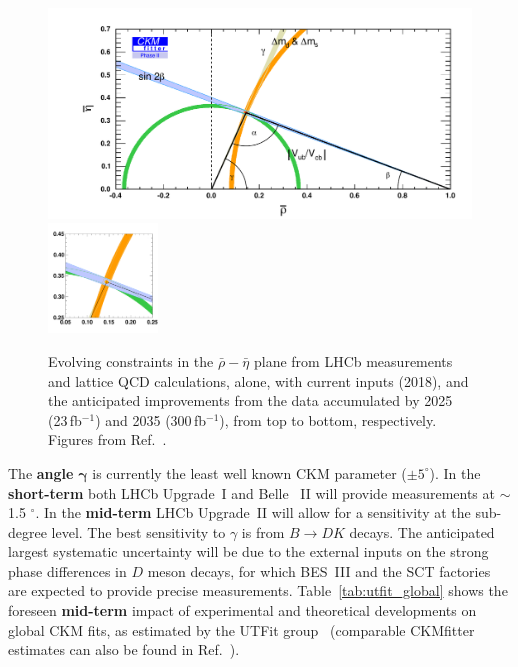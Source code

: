 \begin{figure}[t]
\begin{center}
\begin{minipage}{0.65\textwidth}
\includegraphics[width=\textwidth]{Flavour/figs/rhoeta_small_LHCb_Stage2.pdf}\vspace{-5.36cm}
\mbox{\hspace{7.9cm}\includegraphics[width=0.26\textwidth]{Flavour/figs/rhoeta_small_zoom_LHCb_Stage2.pdf}}
\vspace{2.25cm}
\end{minipage}

\caption{\small  Evolving constraints in the $\bar{\rho}-\bar{\eta}$ plane from LHCb measurements and lattice QCD calculations, alone, with current inputs (2018), and the anticipated improvements from the data accumulated by 2025  (23\,fb$^{-1}$) and 2035 (300\,fb$^{-1}$), from top to bottom, respectively.
Figures from Ref.~\cite{Bediaga:2018lhg}. }
\label{fig:UTprojection}
\end{center}
\end{figure} 

The \textbf{angle} $\pmb{\gamma}$ is currently the least well known CKM parameter ($\pm 5^\circ$).
In the {\bf short-term} both LHCb Upgrade~I and Belle ~II will provide measurements at $\sim$ 1.5 $^\circ$. In the {\bf mid-term} LHCb Upgrade~II will allow for a  sensitivity at the sub-degree level.
The best sensitivity to $\gamma$ is from $B\to DK$ decays. The anticipated largest systematic uncertainty will be due to the external inputs on the strong phase differences in $D$ meson decays, for which 
BES~III and the SCT factories are expected to provide precise measurements.  Table~\ref{tab:utfit_global} shows the foreseen {\bf mid-term} impact of experimental and theoretical developments on global CKM fits, as estimated by the UTFit group~\cite{Cerri:2018ypt} (comparable CKMfitter estimates can also be found in Ref.~\cite{Cerri:2018ypt}).

